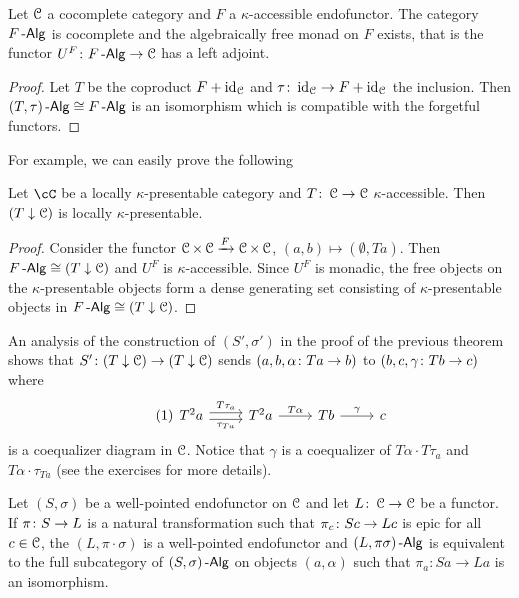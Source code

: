 \documentclass[a4paper,11pt,oneside,openany]{scrbook}
\begin{document}
\begin{thm}
    Let $ \operatorname{\mathcal{C}} $ a cocomplete category and $ F $ a $ \kappa $-accessible endofunctor.
    The category $ F\operatorname{-\mathsf{Alg}} $ is cocomplete and the algebraically free monad on $ F $ exists, that is the functor
    $ U^F \colon F\operatorname{-\mathsf{Alg}} \to \operatorname{\mathcal{C}} $ has a left adjoint.
\end{thm}
\begin{proof}
    Let $ T $ be the coproduct $ F + \operatorname{id}_{\operatorname{\mathcal{C}}} $ and $ \tau\colon \operatorname{id}_{\operatorname{\mathcal{C}}} \to F+\operatorname{id}_{\operatorname{\mathcal{C}}} $ the inclusion.
    Then $  (T,\tau)\operatorname{-\mathsf{Alg}} \cong F\operatorname{-\mathsf{Alg}} $ is an isomorphism which is compatible with the forgetful functors.
\end{proof}
For example, we can easily prove the following
\begin{prop}
    Let $ \cC $ be a locally $ \kappa $-presentable category and $ T \colon \operatorname{\mathcal{C}}
    \to \operatorname{\mathcal{C}} $ $ \kappa $-accessible. Then $ (T\downarrow\operatorname{\mathcal{C}}) $ is locally $ \kappa
    $-presentable.
\end{prop}
\begin{proof}
    Consider the functor $ \operatorname{\mathcal{C}} \times \operatorname{\mathcal{C}} \xrightarrow{F} \operatorname{\mathcal{C}} \times \operatorname{\mathcal{C}} $, $ (a,b)\mapsto (\emptyset, Ta) $.
    Then $ F\operatorname{-\mathsf{Alg}} \cong (T\downarrow\operatorname{\mathcal{C}}) $ and $ U^F $ is $ \kappa $-accessible.
    Since $ U^F  $ is monadic, the free objects on the $ \kappa $-presentable objects form a dense generating set consisting of $ \kappa $-presentable objects in $ F\operatorname{-\mathsf{Alg}} \cong (T\downarrow\operatorname{\mathcal{C}}) $.
\end{proof}
\begin{rmk}
    An analysis of the construction of $ (S',\sigma') $ in the proof of the previous theorem shows that $ S' \colon (T\downarrow\operatorname{\mathcal{C}}) \to (T\downarrow\operatorname{\mathcal{C}}) $ sends $ (a,b,\alpha \colon Ta \to b) $ to $ (b,c, \gamma \colon Tb \to c) $ where
    \begin{displaymath}\tag{1}\label{fork1}
        \begin{tikzcd}
	    T^2 a \arrow[r,shift left, "T \tau_a"]\arrow[r,shift right, "\tau_{Ta}"']& T^2 a \arrow[r, "T\alpha" ] & Tb \arrow[r, "\gamma"]  & c
        \end{tikzcd}
    \end{displaymath}
    is a coequalizer diagram in $ \operatorname{\mathcal{C}} $.
    Notice that $ \gamma $ is a coequalizer of $ T\alpha \cdot T\tau_a $ and $
    T\alpha \cdot \tau_{Ta} $ (see the exercises for more details).
\end{rmk}
\begin{prop}
    Let $ (S,\sigma) $ be a well-pointed endofunctor on $ \operatorname{\mathcal{C}} $ and let $ L\colon \operatorname{\mathcal{C}} \to \operatorname{\mathcal{C}} $ be a functor.
    If $ \pi \colon S \to L $ is a natural transformation such that $ \pi_c \colon
    Sc \to Lc $ is epic for all $ c\in\operatorname{\mathcal{C}} $, the $ (L,\pi\cdot \sigma) $ is a well-pointed endofunctor and $ (L,\pi\sigma)\operatorname{-\mathsf{Alg}} $ is equivalent to the full subcategory of $ (S,\sigma)\operatorname{-\mathsf{Alg}} $ on objects $ (a,\alpha) $ such that $ \pi_a\colon Sa \to La $ is an isomorphism.
\end{prop}
\end{document}
